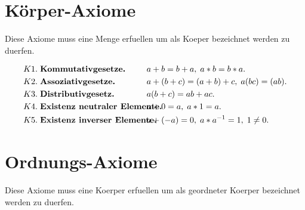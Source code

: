 \documentclass[../AbiMappe_Mathe.tex]{subfiles}
\begin{document}
\theoremstyle{nonumberplain}
\newtheorem{mytheo}{Remark}

\section{Körper-Axiome}
Diese Axiome muss eine Menge erfuellen um als Koeper bezeichnet werden zu duerfen.

\begin{fmytheo}
\vspace{-0.5 cm}
\begin{align*}
K1.\hspace{0.3 em} &\textbf{Kommutativgesetze.}& \hspace{-1.0 cm} &a+b=b+a,\; a*b=b*a.\\
K2.\hspace{0.3 em} &\textbf{Assoziativgesetze.}& \hspace{-1.0 cm} &a+(b+c)=(a+b)+c,\; a(bc)=(ab).\\
K3. \hspace{0.3 em} &\textbf{Distributivgesetz.}& \hspace{-1.0 cm} &a(b+c)=ab+ac.\\
K4.  \hspace{0.3 em} &\textbf{Existenz neutraler Elemente.}& \hspace{-1.0 cm} &a+0=a,\; a*1=a.\\
K5.  \hspace{0.3 em} &\textbf{Existenz inverser Elemente.}& \hspace{-1.0 cm} &a+(-a)=0 ,\; a*a^{-1}=1,\; 1 \neq 0.
\end{align*}
\end{fmytheo}

\section{Ordnungs-Axiome}
Diese Axiome muss eine Koerper erfuellen um als geordneter Koerper bezeichnet werden zu duerfen.
\end{document}
